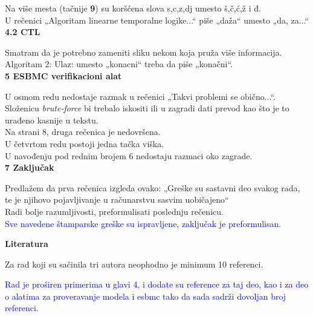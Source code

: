 \documentclass[a4paper]{report}
\newcommand{\odgovor}[1]{\textcolor{blue}{#1}}
\begin{document}
Na više mesta (tačnije \textbf{9}) su koršćena slova s,c,z,dj umesto š,č,ć,ž i đ.
\\U rečenici „Algoritam linearne temporalne logike...“ piše „daža“ umesto „da, za...“
\vspace{0.5cm}\\
\textbf{4.2 CTL}

Smatram da je potrebno zameniti sliku nekom koja pruža više informacija.
\\Algoritam 2: Ulaz: umesto „konacni“ treba da piše „konačni“. 
\vspace{0.5cm}\\
\textbf{5 ESBMC verifikacioni alat}

U osmom redu nedostaje razmak u rečenici „Takvi problemi se obično...“.
\\Složenicu \textit{brute-force} bi trebalo iskositi ili u zagradi dati prevod kao što je to urađeno kasnije u tekstu.
\\Na strani 8, druga rečenica je nedovršena.
\\U četvrtom redu postoji jedna tačka viška.
\\U navođenju pod rednim brojem 6 nedostaju razmaci oko zagrade. 
\vspace{0.5cm}\\
\textbf{7 Zaključak}

Predlažem da prva rečenica izgleda ovako: „Greške su sastavni deo svakog rada, te je njihovo pojavljivanje u računarstvu sasvim uobičajeno“ 
\\Radi bolje razumljivosti, preformulisati poslednju rečenicu.
\vspace{0.5cm}\\
\odgovor{Sve navedene štamparske greške su ispravljene, zaključak je preformulisan.}

\textbf{Literatura}

Za rad koji su sačinila tri autora neophodno je minimum 10 re\-fe\-re\-nci.

\odgovor{Rad je proširen primerima u glavi 4, i dodate su reference za taj deo, kao i za deo o alatima za proveravanje modela i esbmc tako da sada sadrži dovoljan broj referenci.}
\vspace{0.5cm}
\end{document}

